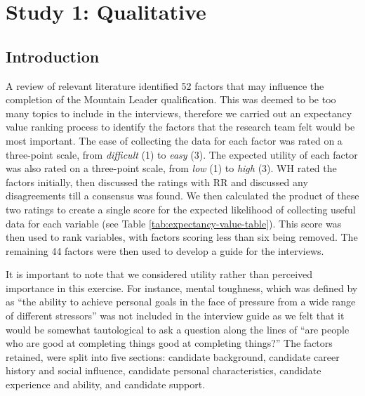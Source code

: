 \documentclass[
  12pt,
  a4paper,
]{book}
\begin{document}
\hypertarget{ml-qualitative}{%
\chapter{Study 1: Qualitative}\label{ml-qualitative}}

\hypertarget{introduction}{%
\section{Introduction}\label{introduction}}

A review of relevant literature identified 52 factors that may influence the completion of the Mountain Leader qualification. This was deemed to be too many topics to include in the interviews, therefore we carried out an expectancy value ranking process to identify the factors that the research team felt would be most important. The ease of collecting the data for each factor was rated on a three-point scale, from \emph{difficult} (1) to \emph{easy} (3). The expected utility of each factor was also rated on a three-point scale, from \emph{low} (1) to \emph{high} (3). WH rated the factors initially, then discussed the ratings with RR and discussed any disagreements till a consensus was found. We then calculated the product of these two ratings to create a single score for the expected likelihood of collecting useful data for each variable (see Table \ref{tab:expectancy-value-table}). This score was then used to rank variables, with factors scoring less than six being removed. The remaining 44 factors were then used to develop a guide for the interviews.

It is important to note that we considered utility rather than perceived importance in this exercise. For instance, mental toughness, which was defined by \citet{Bell2013} as ``the ability to achieve personal goals in the face of pressure from a wide range of different stressors'' was not included in the interview guide as we felt that it would be somewhat tautological to ask a question along the lines of ``are people who are good at completing things good at completing things?'' The factors retained, were split into five sections: candidate background, candidate career history and social influence, candidate personal characteristics, candidate experience and ability, and candidate support.
\end{document}
